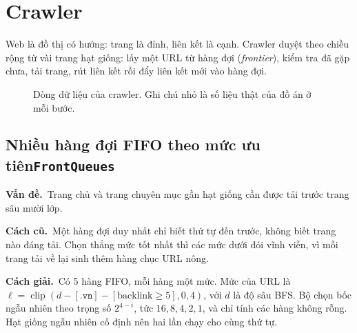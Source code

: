 \documentclass[9pt,twocolumn,a4paper]{extarticle}
\newcommand{\code}[1]{\texttt{#1}}
\newcommand{\dsa}[2]{\subsection[#1]{#1\hfill{\normalfont\footnotesize\code{#2}}}}
\newcommand{\vande}{\textcolor{linkblue}{\textbf{Vấn đề.}}~}
\newcommand{\cachgiai}{\textcolor{linkblue}{\textbf{Cách giải.}}~}
\newcommand{\cu}{\textcolor{linkblue}{\textbf{Cách cũ.}}~}
\begin{document}
\section{Crawler}
\label{sec:crawl}
Web là đồ thị có hướng: trang là đỉnh, liên kết là cạnh. Crawler duyệt theo chiều rộng từ vài trang hạt giống: lấy một URL từ hàng đợi (\emph{frontier}), kiểm tra đã gặp chưa, tải trang, rút liên kết rồi đẩy liên kết mới vào hàng đợi.

\begin{figure}[H]
\centering
{}
\caption{Dòng dữ liệu của crawler. Ghi chú nhỏ là số liệu thật của đồ án ở mỗi bước.}
\label{fig:crawlloop}
\end{figure}

\dsa{Nhiều hàng đợi FIFO theo mức ưu tiên}{FrontQueues}
\vande Trang chủ và trang chuyên mục gần hạt giống cần được tải trước trang sâu mười lớp.

\cu Một hàng đợi duy nhất chỉ biết thứ tự đến trước, không biết trang nào đáng tải. Chọn thẳng mức tốt nhất thì các mức dưới đói vĩnh viễn, vì mỗi trang tải về lại sinh thêm hàng chục URL nông.

\cachgiai Có 5 hàng FIFO, mỗi hàng một mức. Mức của URL là $\ell=\operatorname{clip}(d-[\code{.vn}]-[\text{backlink}\ge5],0,4)$, với $d$ là độ sâu BFS. Bộ chọn bốc ngẫu nhiên theo trọng số $2^{4-i}$, tức $16,8,4,2,1$, và chỉ tính các hàng không rỗng. Hạt giống ngẫu nhiên cố định nên hai lần chạy cho cùng thứ tự.
\end{document}

